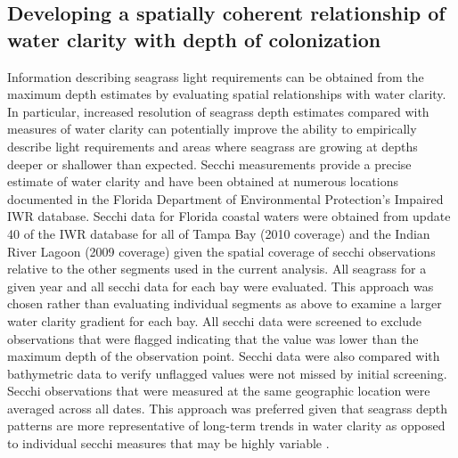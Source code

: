 \documentclass[letterpaper,12pt,oneside]{article}\usepackage[]{graphicx}\usepackage[]{color}
\begin{document}
\subsection{Developing a spatially coherent relationship of water clarity with depth of colonization}

Information describing seagrass light requirements can be obtained from the maximum depth estimates by evaluating spatial relationships with water clarity.  In particular, increased resolution of seagrass depth estimates compared with measures of water clarity can potentially improve the ability to empirically describe light requirements and areas where seagrass are growing at depths deeper or shallower than expected. Secchi measurements provide a precise estimate of water clarity and have been obtained at numerous locations documented in the Florida Department of Environmental Protection's Impaired \ac{IWR} database. Secchi data for Florida coastal waters were obtained from update 40 of the \ac{IWR} database for all of Tampa Bay (2010 coverage) and the Indian River Lagoon (2009 coverage) given the spatial coverage of secchi observations relative to the other segments used in the current analysis.  All seagrass for a given year and all secchi data for each bay were evaluated.  This approach was chosen rather than evaluating individual segments as above to examine a larger water clarity gradient for each bay.  All secchi data were screened to exclude observations that were flagged indicating that the value was lower than the maximum depth of the observation point.  Secchi data were also compared with bathymetric data to verify unflagged values were not missed by initial screening.  Secchi observations that were measured at the same geographic location were averaged across all dates.  This approach was preferred given that seagrass depth patterns are more representative of long-term trends in water clarity as opposed to individual secchi measures that may be highly variable \citep{Dennison87,Dennison93}.
\end{document}
